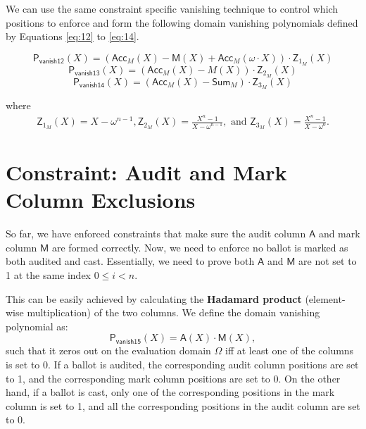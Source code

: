 \begin{itemize}
  We can use the same constraint specific vanishing technique to control which positions to enforce and form the following domain vanishing polynomials defined by Equations \ref{eq:12} to \ref{eq:14}.

\begin{equation}
\label{eq:12}
\mathsf{P_{vanish12}}(X)=(\mathsf{Acc}_M(X) - \mathsf{M}(X) + \mathsf{Acc}_M(\omega\cdot X)) \cdot \mathsf{Z}_{1_M}(X)
\end{equation}
\begin{equation}
  \label{eq:13}
\mathsf{P_{vanish13}}(X)=(\mathsf{Acc}_M(X) - M(X)) \cdot \mathsf{Z}_{2_M}(X)
\end{equation}
\begin{equation}
  \label{eq:14}
\mathsf{P_{vanish14}}(X)=(\mathsf{Acc}_M(X) - \mathsf{Sum}_M) \cdot \mathsf{Z}_{3_M}(X)
\end{equation}

where 
\begin{align*}
  \mathsf{Z}_{1_M}(X)=X-\omega^{n-1}, \mathsf{Z}_{2_M}(X)=\frac{X^n-1}{X-\omega^{n-1}}, \text{ and } \mathsf{Z}_{3_M}(X)=\frac{X^n-1}{X-\omega^{0}}.
\end{align*}

\end{itemize}

\section{Constraint: Audit and Mark Column Exclusions}
So far, we have enforced constraints that make sure the audit column $\mathsf{A}$ and mark column $\mathsf{M}$ are formed correctly. 
Now, we need to enforce no ballot is marked as both audited and cast. Essentially, we need to prove both $\mathsf{A}$ and $\mathsf{M}$ are not set to 1 at the same index $0\le i<n$.

This can be easily achieved by calculating the \textbf{Hadamard product} (element-wise multiplication) of the two columns. We define the domain vanishing polynomial as:
\begin{equation}
  \label{eq:15}
\mathsf{P_{vanish15}}(X) = \mathsf{A}(X)\cdot \mathsf{M}(X),
\end{equation}
such that it zeros out on the evaluation domain $\Omega$ iff at least one of the columns is set to 0. If a ballot is audited, the corresponding audit column positions are set to 1, and the corresponding mark column positions are set to 0. 
On the other hand, if a ballot is cast, only one of the corresponding positions in the mark column is set to 1, and all the corresponding positions in the audit column are set to 0.

